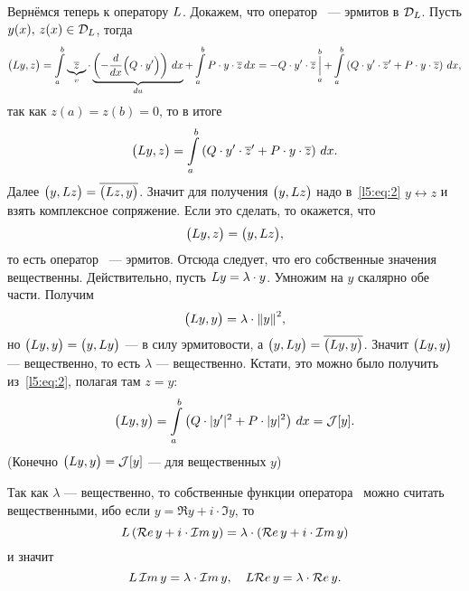 \noindent Вернёмся теперь к оператору $L$. Докажем, что оператор \LL\ --- эрмитов в $\mathcal{D}_{L}$. Пусть $y(x),\,z(x)\in\mathcal{D}_{L}$, тогда
\begin{equation*}
	\big(L y,z\big)=\int\limits_a^b \underbrace{\overline{z}}_{v}\cdot\underbrace{\left(-\frac{d}{dx}\Big(Q\cdot y'\Big)\right)\,dx}_{du}+\int\limits_a^b P\cdot y\cdot\overline{z}\,dx=-Q\cdot y'\cdot\overline{z}\mathop{\Big|}\limits_a^b+\int\limits_a^b\left(Q\cdot y'\cdot\overline{z}'+P\cdot y\cdot\overline{z}\right)\,dx,
\end{equation*}
так как $z(a)=z(b)=0$, то в итоге 
\begin{equation}
	\label{l5:eq:2}
	\hfill\big(\LL y,z\big)=\int\limits_a^b\left(Q\cdot y'\cdot\overline{z}'+P\cdot y\cdot\overline{z}\right)\,dx.\hfill
\end{equation}
Далее $\big(y,L z\big)=\overline{\big(L z,y\big)}$. Значит для получения $\big(y,L z\big)$ надо в~\eqref{l5:eq:2} $y\leftrightarrow z$ и взять комплексное сопряжение. Если это сделать, то окажется, что
\begin{equation*}
	\hfill\big(\LL y,z\big)=\big(y,\LL z\big),\hfill
\end{equation*} 
то есть оператор \LL\ --- эрмитов. Отсюда следует, что его собственные значения вещественны. Действительно, пусть $L y=\lambda\cdot y$. Умножим на $y$ скалярно обе части. Получим
\begin{equation*}
	\hfill\big(\LL y,y\big)=\lambda\cdot{\norm{y}}^2,\hfill
\end{equation*}
но $\big(L y,y\big)=\big(y,L y\big)$ --- в силу эрмитовости, а $\big(y,L y\big)=\overline{\big(L y,y\big)}$. Значит $\big(L y,y\big)$ --- вещественно, то есть $\lambda$ --- вещественно. Кстати, это можно было получить из~\eqref{l5:eq:2}, полагая там $z=y$:
\begin{equation}
	\label{l5:eq:3}
	\hfill \big(\LL y,y\big)=\int\limits_a^b\left(Q\cdot|y'|^2+P\cdot|y|^2\right)\,dx=\J[y].\hfill
\end{equation}
(Конечно $\big(L y,y\big)=\mathcal{J}[y]$ --- для вещественных $y$)

Так как $\lambda$ --- вещественно, то собственные функции оператора \LL\ можно считать вещественными, ибо если $y=\Re y+i\cdot\Im y$, то 
\begin{equation*}
	\hfill\LL\left(\Re y+i\cdot\Im y\right)=\lambda\cdot\left(\Re y+i\cdot\Im y\right)\hfill
\end{equation*} 
и значит 
\begin{equation*}
	\hfill\LL\,\Im y=\lambda\cdot\Im y,\quad\LL\Re y=\lambda\cdot\Re y.\hfill
\end{equation*}

